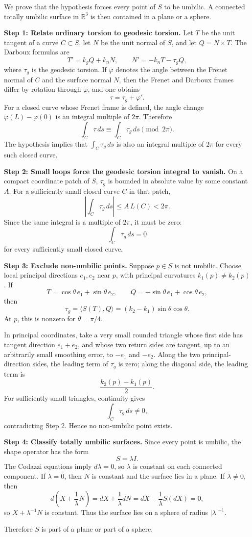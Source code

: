 \begin{solution}
We prove that the hypothesis forces every point of $S$ to be umbilic. A connected totally umbilic surface in $\mathbb{R}^3$ is then contained in a plane or a sphere.

\textbf{Step 1: Relate ordinary torsion to geodesic torsion.}
Let $T$ be the unit tangent of a curve $C\subset S$, let $N$ be the unit normal of $S$, and let $Q=N\times T$. The Darboux formulas are
\[
T'=k_gQ+k_nN,\qquad
N'=-k_nT-\tau_g Q,
\]
where $\tau_g$ is the geodesic torsion. If $\varphi$ denotes the angle between the Frenet normal of $C$ and the surface normal $N$, then the Frenet and Darboux frames differ by rotation through $\varphi$, and one obtains
\[
\tau=\tau_g+\varphi'.
\]
For a closed curve whose Frenet frame is defined, the angle change $\varphi(L)-\varphi(0)$ is an integral multiple of $2\pi$. Therefore
\[
\int_C \tau\,ds\equiv \int_C \tau_g\,ds \pmod{2\pi}.
\]
The hypothesis implies that $\int_C\tau_g\,ds$ is also an integral multiple of $2\pi$ for every such closed curve.

\textbf{Step 2: Small loops force the geodesic torsion integral to vanish.}
On a compact coordinate patch of $S$, $\tau_g$ is bounded in absolute value by some constant $A$. For a sufficiently small closed curve $C$ in that patch,
\[
\left|\int_C\tau_g\,ds\right|\leq A\,L(C)<2\pi.
\]
Since the same integral is a multiple of $2\pi$, it must be zero:
\[
\int_C\tau_g\,ds=0
\]
for every sufficiently small closed curve.

\textbf{Step 3: Exclude non-umbilic points.}
Suppose $p\in S$ is not umbilic. Choose local principal directions $e_1,e_2$ near $p$, with principal curvatures $k_1(p)\neq k_2(p)$. If
\[
T=\cos\theta\,e_1+\sin\theta\,e_2,
\qquad
Q=-\sin\theta\,e_1+\cos\theta\,e_2,
\]
then
\[
\tau_g=\langle S(T),Q\rangle=(k_2-k_1)\sin\theta\cos\theta.
\]
At $p$, this is nonzero for $\theta=\pi/4$.

In principal coordinates, take a very small rounded triangle whose first side has tangent direction $e_1+e_2$, and whose two return sides are tangent, up to an arbitrarily small smoothing error, to $-e_1$ and $-e_2$. Along the two principal-direction sides, the leading term of $\tau_g$ is zero; along the diagonal side, the leading term is
\[
\frac{k_2(p)-k_1(p)}{2}.
\]
For sufficiently small triangles, continuity gives
\[
\int_C\tau_g\,ds\neq 0,
\]
contradicting Step 2. Hence no non-umbilic point exists.

\textbf{Step 4: Classify totally umbilic surfaces.}
Since every point is umbilic, the shape operator has the form
\[
S=\lambda I.
\]
The Codazzi equations imply $d\lambda=0$, so $\lambda$ is constant on each connected component. If $\lambda=0$, then $N$ is constant and the surface lies in a plane. If $\lambda\neq 0$, then
\[
d\left(X+\frac{1}{\lambda}N\right)=dX+\frac{1}{\lambda}dN
=dX-\frac{1}{\lambda}S(dX)=0,
\]
so $X+\lambda^{-1}N$ is constant. Thus the surface lies on a sphere of radius $|\lambda|^{-1}$.

Therefore $S$ is part of a plane or part of a sphere.
\end{solution}
